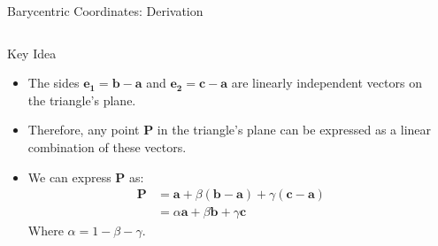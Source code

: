 \begin{frame}{Barycentric Coordinates: Derivation}
    \begin{columns}
        \begin{column}{0.65\textwidth}
            \begin{mathbox}{Key Idea}
                \begin{itemize}
                    \item  The sides
                        $\mathbf{e_1} = \mathbf{b} - \mathbf{a}$ and $\mathbf{e_2} = \mathbf{c} - \mathbf{a}$ are linearly independent vectors on the triangle's plane.
                    \pause
                    \item Therefore, any point $\mathbf{P}$ in the triangle's plane can be expressed as a linear combination of these vectors.
                    \pause
                    \item We can express $\mathbf{P}$ as:
                        \begin{align*}
                            \mathbf{P} &= \mathbf{a} + \beta(\mathbf{b}-\mathbf{a}) + \gamma(\mathbf{c}-\mathbf{a}) \\
                            &= \alpha \mathbf{a} + \beta \mathbf{b} + \gamma \mathbf{c}
                        \end{align*}
                        Where $\alpha = 1 - \beta - \gamma$.
                \end{itemize}
            \end{mathbox}
           
            

        \end{column}
        \begin{column}{0.35\textwidth}
\end{column}
\end{columns}
\end{frame}
